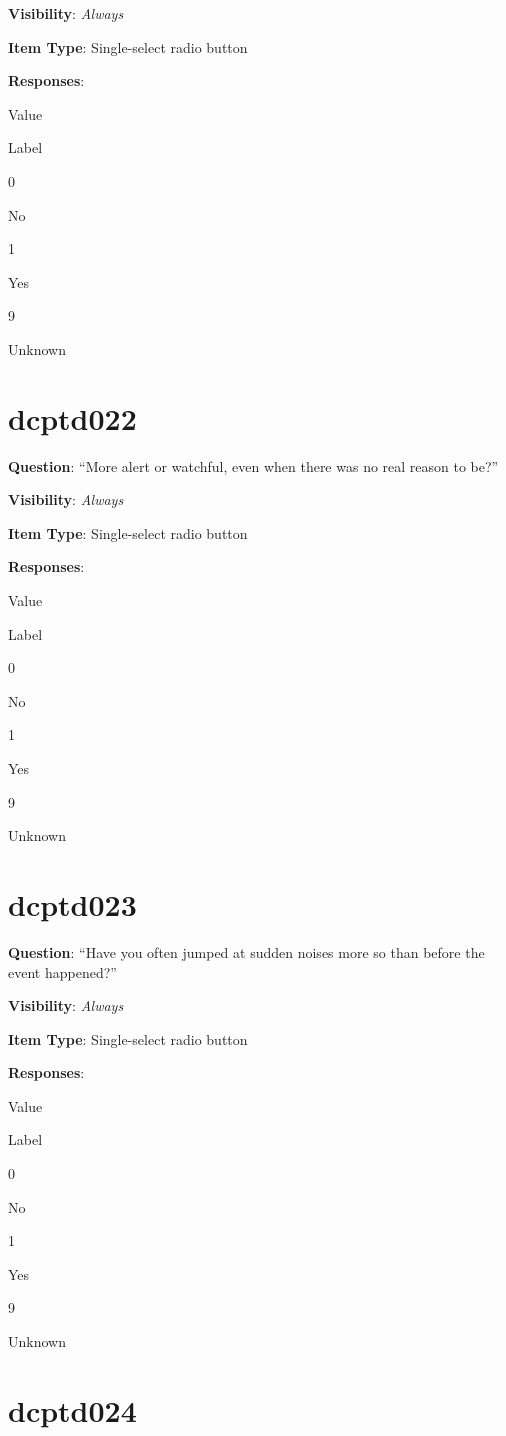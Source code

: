 \documentclass[]{book}
\begin{document}
\textbf{Visibility}: \emph{Always}

\textbf{Item Type}: Single-select radio button

\textbf{Responses}:

Value

Label

0

No

1

Yes

9

Unknown

\hypertarget{dcptd022}{%
\section{dcptd022}\label{dcptd022}}

\textbf{Question}: ``More alert or watchful, even when there was no real reason to be?''

\textbf{Visibility}: \emph{Always}

\textbf{Item Type}: Single-select radio button

\textbf{Responses}:

Value

Label

0

No

1

Yes

9

Unknown

\hypertarget{dcptd023}{%
\section{dcptd023}\label{dcptd023}}

\textbf{Question}: ``Have you often jumped at sudden noises more so than before the event happened?''

\textbf{Visibility}: \emph{Always}

\textbf{Item Type}: Single-select radio button

\textbf{Responses}:

Value

Label

0

No

1

Yes

9

Unknown

\hypertarget{dcptd024}{%
\section{dcptd024}\label{dcptd024}}
\end{document}
